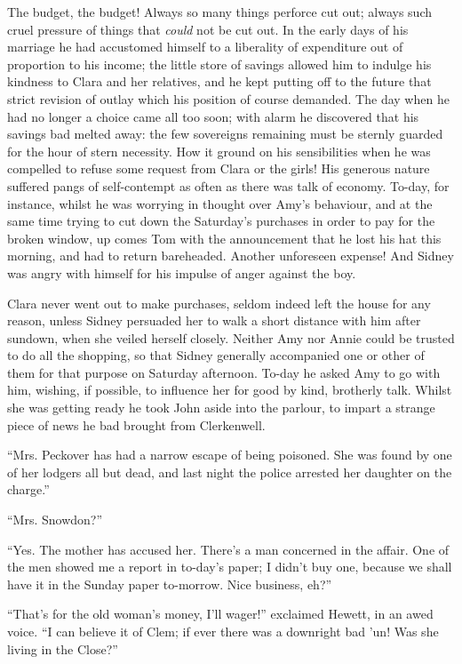The budget, the budget! Always so many things perforce cut out; always
such cruel pressure of things that \emph{could} not be cut out. In the
early days of his marriage he had accustomed himself to a liberality of
expenditure out of proportion to his income; the little store of savings
allowed him to indulge his kindness to Clara and her relatives, and he
kept putting off to the future that strict revision of outlay which his
position of course demanded. The day when he had no longer a choice came
all too soon; with alarm he discovered that his {}savings bad melted
away: the few sovereigns remaining must be sternly guarded for the hour
of stern necessity. How it ground on his sensibilities when he was
compelled to refuse some request from Clara or the girls! His generous
nature suffered pangs of self-contempt as often as there was talk of
economy. To-day, for instance, whilst he was worrying in thought over
Amy's behaviour, and at the same time trying to cut down the Saturday's
purchases in order to pay for the broken window, up comes Tom with the
announcement that he lost his hat this morning, and had to return
bareheaded. Another unforeseen expense! And Sidney was angry with
himself for his impulse of anger against the boy.

Clara never went out to make purchases, seldom indeed left the house for
any reason, unless Sidney persuaded her to walk a short distance with
him after sundown, when she veiled herself closely. Neither Amy nor
Annie could be trusted to do all the shopping, so that Sidney generally
accompanied one or other of them for that purpose on Saturday afternoon.
To-day he asked Amy to go with him, wishing, if possible, to influence
her for good by kind, {}brotherly talk. Whilst she was getting ready he
took John aside into the parlour, to impart a strange piece of news he
bad brought from Clerkenwell.

``Mrs. Peckover has had a narrow escape of being poisoned. She was found
by one of her lodgers all but dead, and last night the police arrested
her daughter on the charge.''

``Mrs. Snowdon?''

``Yes. The mother has accused her. There's a man concerned in the
affair. One of the men showed me a report in to-day's paper; I didn't
buy one, because we shall have it in the Sunday paper to-morrow. Nice
business, eh?''

``That's for the old woman's money, I'll wager!'' exclaimed Hewett, in
an awed voice. ``I can believe it of Clem; if ever there was a downright
bad 'un! Was she living in the Close?''

